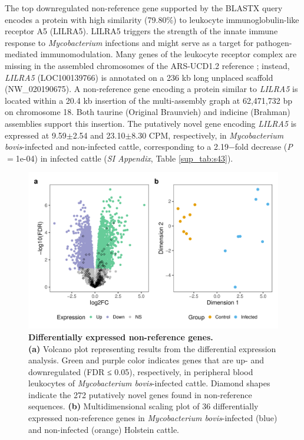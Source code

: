 \documentclass[../main.tex]{subfiles}
\begin{document}
The top downregulated non-reference gene supported by the BLASTX query encodes a protein with high similarity (79.80\%) to leukocyte immunoglobulin-like receptor A5 (LILRA5). LILRA5 triggers the strength of the innate immune response to \emph{Mycobacterium} infections \citep{bah2018meta} and might serve as a target for pathogen-mediated immunomodulation. Many genes of the leukocyte receptor complex are missing in the assembled chromosomes of the ARS-UCD1.2 reference \citep{bakshy2021development}; instead, \emph{LILRA5} (LOC100139766) is annotated on a 236 kb long unplaced scaffold (NW\_020190675). A non-reference gene encoding a protein similar to \emph{LILRA5} is located within a 20.4 kb insertion of the multi-assembly graph at 62,471,732 bp on chromosome 18. Both taurine (Original Braunvieh) and indicine (Brahman) assemblies support this insertion. The putatively novel gene encoding \emph{LILRA5} is expressed at 9.59$±$2.54 and 23.10$±$8.30 CPM, respectively, in \emph{Mycobacterium bovis}-infected and non-infected cattle, corresponding to a 2.19$-$fold decrease (\emph{P}$=$1e-04) in infected cattle (\emph{SI Appendix}, Table \ref{sup_tab:s43}).

\begin{figure}[!htb]
    \centering
    \includegraphics[width=\textwidth]{paper3/main_figure/Fig4.pdf}
        \caption[Differential expression of novel genes]{\textbf{Differentially expressed non-reference genes.} \\
        \footnotesize{\textbf{(a)} Volcano plot representing results from the differential expression analysis. Green and purple color indicates genes that are up- and downregulated (FDR ≤ 0.05), respectively, in peripheral blood leukocytes of \emph{Mycobacterium bovis}-infected cattle. Diamond shapes indicate the 272 putatively novel genes found in non-reference sequences. \textbf{(b)} Multidimensional scaling plot of 36 differentially expressed non-reference genes in \emph{Mycobacterium bovis}-infected (blue) and non-infected (orange) Holstein cattle.}}
        \label{fig44:rnadif}
\end{figure}
\end{document}
